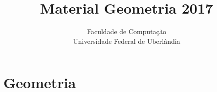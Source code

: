 \documentclass[12pt,a4paper, twoside]{report}
\title{Material Geometria 2017}
\author{ %
Faculdade de Computação \\
Universidade Federal de Uberlândia
}
\date{}
\begin{document}
  \maketitle

\tableofcontents    


\fancyhead[RE,LO]{\thesection}

\setlength{\parskip}{0.15in} %

\chapter{Geometria}
\end{document}
